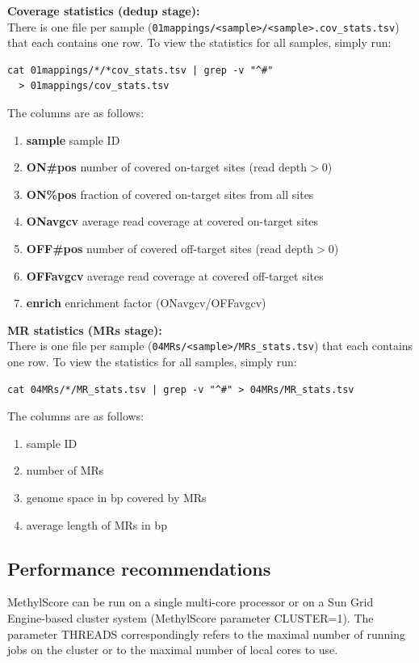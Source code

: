 \documentclass{article}
\begin{document}
\noindent \textbf{Coverage statistics (dedup stage):}\\
\noindent There is one file per sample (\verb|01mappings/<sample>/<sample>.cov_stats.tsv|) that each contains one row. To view the statistics for all samples, simply run:
\begin{lstlisting}
cat 01mappings/*/*cov_stats.tsv | grep -v "^#" 
  > 01mappings/cov_stats.tsv
\end{lstlisting}
The columns are as follows:
\begin{enumerate}
	\item \textbf{sample} sample ID
	\item \textbf{ON\#pos} number of covered on-target sites (read depth$>$0)
	\item \textbf{ON\%pos} fraction of covered on-target sites from all sites
	\item \textbf{ONavgcv} average read coverage at covered on-target sites
	\item \textbf{OFF\#pos} number of covered off-target sites (read depth$>$0)
	\item \textbf{OFFavgcv} average read coverage at covered off-target sites
	\item \textbf{enrich} enrichment factor (ONavgcv/OFFavgcv)
\end{enumerate}
			
\noindent \textbf{MR statistics (MRs stage):}\\
\noindent There is one file per sample (\verb|04MRs/<sample>/MRs_stats.tsv|) that each contains one row. To view the statistics for all samples, simply run:
\begin{lstlisting}
cat 04MRs/*/MR_stats.tsv | grep -v "^#" > 04MRs/MR_stats.tsv
\end{lstlisting}
The columns are as follows:
\begin{enumerate}
	\item sample ID
	\item number of MRs
	\item genome space in bp covered by MRs
	\item average length of MRs in bp
\end{enumerate}
	
	
\subsection{Performance recommendations}

MethylScore can be run on a single multi-core processor or on a Sun Grid Engine-based cluster system (MethylScore parameter CLUSTER=1). The parameter THREADS correspondingly refers to the maximal number of running jobs on the cluster or to the maximal number of local cores to use.
\end{document}
